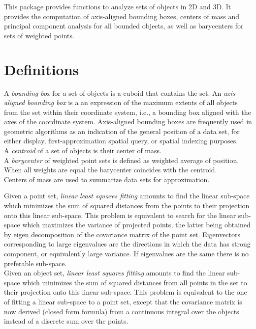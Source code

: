 This package provides functions to analyze sets of objects in 2D and 3D. It provides the computation of axis-aligned bounding boxes, centers of mass and principal component analysis for all bounded objects, as well as barycenters for sets of weighted points.\\


\section{Definitions}

A \emph{bounding box} for a set of objects is a cuboid that contains the set. An \emph{axis-aligned bounding box} is a an expression of the maximum extents of all objects from the set within their coordinate system, i.e., a bounding box aligned with the axes of the coordinate system. Axis-aligned bounding boxes are frequently used in geometric algorithms as an indication of the general position of a data set, for either display, first-approximation spatial query, or spatial indexing purposes. \\

A \emph{centroid} of a set of objects is their center of mass. \\


A \emph{barycenter} of weighted point sets is defined as weighted
average of position. When all weights are equal the barycenter coincides with the centroid.\\
Centers of mass are used to summarize data sets for approximation.


Given a point set, \emph{linear least squares fitting} amounts to find the linear sub-space which minimizes the sum of squared distances from the points to their projection onto this linear sub-space. This problem is equivalent to search for the linear sub-space which maximizes the variance of projected points, the latter being obtained by eigen decomposition of the covariance matrix of the point set. Eigenvectors corresponding to large eigenvalues are the
directions in which the data has strong component, or equivalently large variance. If eigenvalues are the same there is no preferable sub-space.\\

Given an object set, \emph{linear least squares fitting} amounts to find the linear sub-space which minimizes the sum of squared distances from all points in the set to their projection onto this linear sub-space. This problem is equivalent to the one of fitting a linear sub-space to a point set, except that the covariance matrix is now derived (closed form formula) from a continuous integral over the objects instead of a discrete sum over the points.


